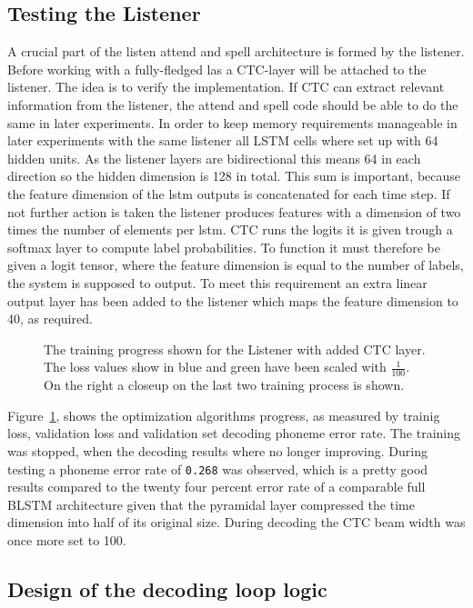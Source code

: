 \subsection{Testing the Listener}
A crucial part of the listen attend and spell architecture is formed by the listener. Before working with a fully-fledged las a CTC-layer will be attached to the listener.
The idea is to verify the implementation. If CTC can extract relevant information from the listener, the attend and spell code should be able to do the same in later experiments. In order to keep memory requirements manageable in later experiments with the same listener all LSTM cells where set up with 64 hidden units. As the listener layers are bidirectional this means 64 in each direction so the hidden dimension is 128 in total. This sum is important, because the feature dimension of the lstm outputs is concatenated for each time step. If not further action is taken the listener produces features with a dimension of two times the number of elements per lstm.
CTC runs the logits it is given trough a softmax layer to compute label probabilities. To function it must therefore be given a logit tensor, where the feature dimension is equal to the number of labels, the system is supposed to output. To meet this requirement an extra linear output layer has been added to the listener which maps the feature dimension to 40, as required.
\begin{figure}


\caption{The training progress shown for the Listener with added CTC layer. The loss values show in blue and green have been scaled with $\frac{1}{100}$. On the right a closeup on the last two training process is shown.}
\label{fig:listenCTC}
\end{figure}
Figure~\ref{fig:listenCTC}, shows the optimization algorithms progress, as measured by trainig loss, validation loss and validation set decoding phoneme error rate. The training was stopped, when the decoding results where no longer improving. During testing a phoneme error rate of \texttt{0.268} was observed, which is a pretty good results compared to the twenty four percent error rate of a comparable full BLSTM architecture given that the pyramidal layer compressed the time dimension into half of its original size. During decoding the CTC beam width was once more set to 100.

\subsection{Design of the decoding loop logic}

